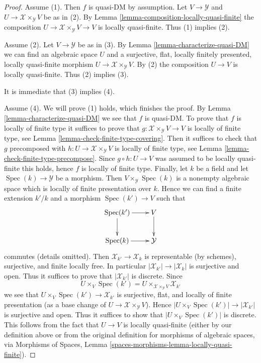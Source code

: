 \documentclass[10pt,a4paper]{amsart}
\theoremstyle{plain}
\theoremstyle{definition}
\theoremstyle{remark}
\numberwithin{equation}{subsection}
\def\Spec{\mathop{\mathrm{Spec}}}
\begin{document}
\begin{proof}
Assume (1). Then $f$ is quasi-DM by assumption. Let
$V \to \mathcal{Y}$ and $U \to \mathcal{X} \times_\mathcal{Y} V$
be as in (2). By
Lemma \ref{lemma-composition-locally-quasi-finite}
the composition $U \to \mathcal{X} \times_\mathcal{Y} V \to V$ is
locally quasi-finite. Thus (1) implies (2).

\medskip\noindent
Assume (2). Let $V \to \mathcal{Y}$ be as in (3). By
Lemma \ref{lemma-characterize-quasi-DM}
we can find an algebraic space $U$ and a surjective, flat, locally
finitely presented, locally quasi-finite morphism
$U \to \mathcal{X} \times_\mathcal{Y} V$. By (2) the composition
$U \to V$ is locally quasi-finite. Thus (2) implies (3).

\medskip\noindent
It is immediate that (3) implies (4).

\medskip\noindent
Assume (4). We will prove (1) holds, which finishes the proof. By
Lemma \ref{lemma-characterize-quasi-DM}
we see that $f$ is quasi-DM. To prove that $f$ is locally of finite type
it suffices to prove that $g : \mathcal{X} \times_\mathcal{Y} V \to V$ is
locally of finite type, see
Lemma \ref{lemma-check-finite-type-covering}.
Then it suffices to check that $g$ precomposed with
$h : U \to \mathcal{X} \times_\mathcal{Y} V$ is locally of finite type, see
Lemma \ref{lemma-check-finite-type-precompose}.
Since $g \circ h : U \to V$ was assumed to be locally quasi-finite
this holds, hence $f$ is locally of finite type.
Finally, let $k$ be a field and let $\Spec(k) \to \mathcal{Y}$
be a morphism. Then $V \times_\mathcal{Y} \Spec(k)$ is
a nonempty algebraic space which is locally of finite presentation
over $k$. Hence we can find a finite extension $k'/k$ and
a morphism $\Spec(k') \to V$ such that
$$
\xymatrix{
\Spec(k') \ar[r] \ar[d] & V \ar[d] \\
\Spec(k) \ar[r] & \mathcal{Y}
}
$$
commutes (details omitted). Then $\mathcal{X}_{k'} \to \mathcal{X}_k$
is representable (by schemes), surjective, and finite locally free. In
particular $|\mathcal{X}_{k'}| \to |\mathcal{X}_k|$ is surjective and open.
Thus it suffices to prove that $|\mathcal{X}_{k'}|$ is discrete. Since
$$
U \times_V \Spec(k') =
U \times_{\mathcal{X} \times_\mathcal{Y} V} \mathcal{X}_{k'}
$$
we see that $U \times_V \Spec(k') \to \mathcal{X}_{k'}$ is
surjective, flat, and locally of finite presentation (as a base change
of $U \to \mathcal{X} \times_\mathcal{Y} V$). Hence
$|U \times_V \Spec(k')| \to |\mathcal{X}_{k'}|$ is surjective and
open. Thus it suffices to show that $|U \times_V \Spec(k')|$ is
discrete. This follows from the fact that $U \to V$ is locally
quasi-finite (either by our definition above or from the original definition
for morphisms of algebraic spaces, via
Morphisms of Spaces, Lemma \ref{spaces-morphisms-lemma-locally-quasi-finite}).
\end{proof}
\end{document}
